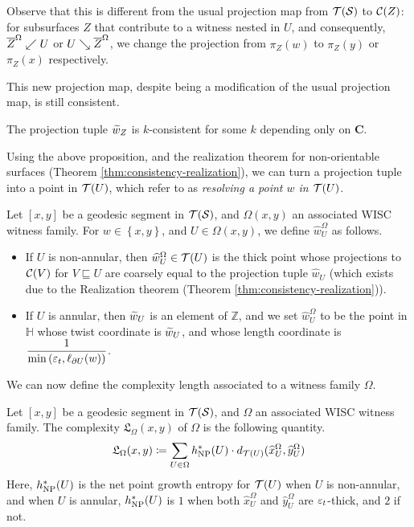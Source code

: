  Observe that this is different from the usual projection map from $\mathcal{T}(\mathcal{S})$ to $\mathcal{C}(Z)$: for subsurfaces $Z$ that contribute to a witness nested in $U$, and consequently, $\overline{Z}^{\Omega} \swarrow U$ or $U \searrow \overline{Z}^{\Omega}$, we change the projection from $\pi_Z(w)$ to $\pi_Z(y)$ or $\pi_Z(x)$ respectively.

  This new projection map, despite being a modification of the usual projection map, is still consistent.
  \begin{proposition}
    The projection tuple $\widetilde{w}_Z$ is $k$-consistent for some $k$ depending only on $\mathbf{C}$.
  \end{proposition}

  Using the above proposition, and the realization theorem for non-orientable surfaces (Theorem \ref{thm:consistency-realization}), we can turn a projection tuple into a point in $\mathcal{T}(U)$, which \textcite{dowdall2023lattice} refer to as \emph{resolving a point $w$ in $\mathcal{T}(U)$}.
  \begin{definition}
    Let $[x,y]$ be a geodesic segment in $\mathcal{T}(\mathcal{S})$, and $\Omega(x,y)$ an associated WISC witness family.
    For $w \in \left\{ x, y \right\}$, and $U \in \Omega(x,y)$, we define $\widehat{w}_U^{\Omega}$ as follows.
    \begin{itemize}
    \item If $U$ is non-annular, then $\widehat{w}_U^{\Omega} \in \mathcal{T}(U)$ is the thick point whose projections to $\mathcal{C}(V)$ for $V \sqsubseteq U$ are coarsely equal to the projection tuple $\widehat{w}_U$ (which exists due to the Realization theorem (Theorem \ref{thm:consistency-realization})).
    \item If $U$ is annular, then $\widetilde{w}_U$ is an element of $\mathbb{Z}$, and we set $\widehat{w}_U^{\Omega}$ to be the point in $\mathbb{H}$ whose twist coordinate is $\widetilde{w}_U$, and whose length coordinate is $\displaystyle \frac{1}{\min\left( {\varepsilon_t}, \ell_{\partial U}(w) \right)}$.
    \end{itemize}
  \end{definition}

  We can now define the complexity length associated to a witness family $\Omega$.

  \begin{definition}
    Let $[x, y]$ be a geodesic segment in $\mathcal{T}(\mathcal{S})$, and $\Omega$ an associated WISC witness family.
    The complexity $\mathfrak{L}_{\Omega}(x,y)$ of $\Omega$ is the following quantity.
    \begin{align*}
      \mathfrak{L}_{\Omega}(x,y) \coloneqq \sum_{U \in \Omega} h_{\mathrm{NP}}^{\ast}(U) \cdot d_{\mathcal{T}(U)}(\widehat{x}_{U}^{\Omega}, \widehat{y}_{U}^{\Omega})
    \end{align*}
    Here, $h_{\mathrm{NP}}^{\ast}(U)$ is the net point growth entropy for $\mathcal{T}(U)$ when $U$ is non-annular, and when $U$ is annular, $h_{\mathrm{NP}}^{\ast}(U)$ is $1$ when both $\widehat{x}_{U}^{\Omega}$ and $\widehat{y}_{U}^{\Omega}$ are ${\varepsilon_t}$-thick, and $2$ if not.
  \end{definition}

